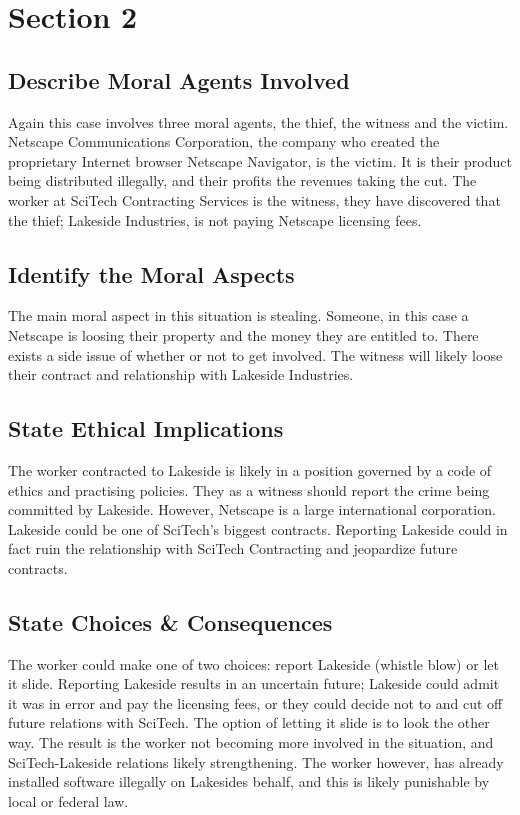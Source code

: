 \section{Section 2}
\subsection{Describe Moral Agents Involved}
Again this case involves three moral agents, the thief, the witness and the victim.
Netscape Communications Corporation, the company who created the proprietary Internet browser Netscape Navigator, is the victim. It is their product being distributed illegally, and their profits the revenues taking the cut. The worker at SciTech Contracting Services is the witness, they have discovered that the thief; Lakeside Industries, is not paying Netscape licensing fees.
\subsection{Identify the Moral Aspects}
The main moral aspect in this situation is stealing. Someone, in this case a Netscape is loosing their property and the money they are entitled to. There exists a side issue of whether or not to get involved. The witness will likely loose their contract and relationship with Lakeside Industries. 
\subsection{State Ethical Implications}
The worker contracted to Lakeside is likely in a position governed by a code of ethics and practising policies. They as a witness should report the crime being committed by Lakeside. However, Netscape is a large international corporation. Lakeside could be one of SciTech's biggest contracts. Reporting Lakeside could in fact ruin the relationship with SciTech Contracting and jeopardize future contracts.  
\subsection{State Choices \& Consequences}
The worker could make one of two choices: report Lakeside (whistle blow) or let it slide. Reporting Lakeside results in an uncertain future; Lakeside could admit it was in error and pay the licensing fees, or they could decide not to and cut off future relations with SciTech. The option of letting it slide is to look the other way. The result is the worker not becoming more involved in the situation, and SciTech-Lakeside relations likely strengthening. The worker however, has already installed software illegally on Lakesides behalf, and this is likely punishable by local or federal law.